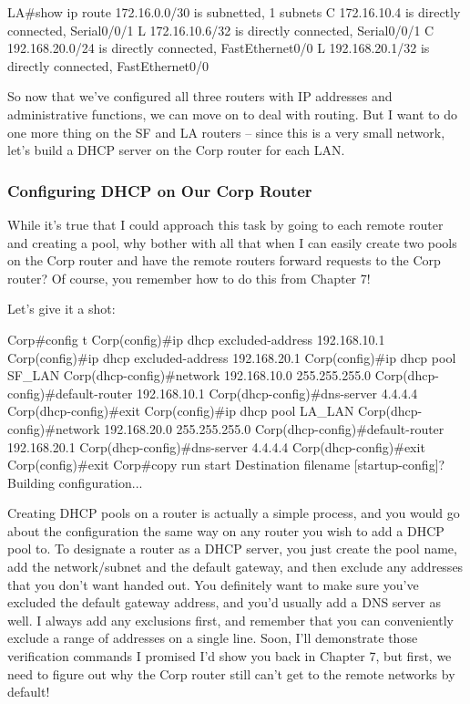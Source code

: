 \begin{cli}
LA#show ip route
     172.16.0.0/30 is subnetted, 1 subnets
C       172.16.10.4 is directly connected, Serial0/0/1
L       172.16.10.6/32 is directly connected, Serial0/0/1
C    192.168.20.0/24 is directly connected, FastEthernet0/0
L    192.168.20.1/32 is directly connected, FastEthernet0/0
\end{cli}

So now that we've configured all three routers with IP addresses and
administrative functions, we can move on to deal with routing. But I
want to do one more thing on the SF and LA routers -- since this is a
very small network, let's build a DHCP server on the Corp router for
each LAN.

\subsubsection{Configuring DHCP on Our Corp Router}

While it's true that I could approach this task by going to each remote
router and creating a pool, why bother with all that when I can easily
create two pools on the Corp router and have the remote routers forward
requests to the Corp router? Of course, you remember how to do this from
Chapter 7!

Let's give it a shot:

\begin{cli}
Corp#config t
Corp(config)#ip dhcp excluded-address 192.168.10.1
Corp(config)#ip dhcp excluded-address 192.168.20.1
Corp(config)#ip dhcp pool SF_LAN
Corp(dhcp-config)#network 192.168.10.0 255.255.255.0
Corp(dhcp-config)#default-router 192.168.10.1
Corp(dhcp-config)#dns-server 4.4.4.4
Corp(dhcp-config)#exit
Corp(config)#ip dhcp pool LA_LAN
Corp(dhcp-config)#network 192.168.20.0 255.255.255.0
Corp(dhcp-config)#default-router 192.168.20.1
Corp(dhcp-config)#dns-server 4.4.4.4
Corp(dhcp-config)#exit
Corp(config)#exit
Corp#copy run start
Destination filename [startup-config]?
Building configuration...
\end{cli}

Creating DHCP pools on a router is actually a simple process, and you
would go about the configuration the same way on any router you wish to
add a DHCP pool to. To designate a router as a DHCP server, you just
create the pool name, add the network/subnet and the default gateway,
and then exclude any addresses that you don't want handed out. You
definitely want to make sure you've excluded the default gateway
address, and you'd usually add a DNS server as well. I always add any
exclusions first, and remember that you can conveniently exclude a range
of addresses on a single line. Soon, I'll demonstrate those verification
commands I promised I'd show you back in Chapter 7, but first, we need
to figure out why the Corp router still can't get to the remote networks
by default!

